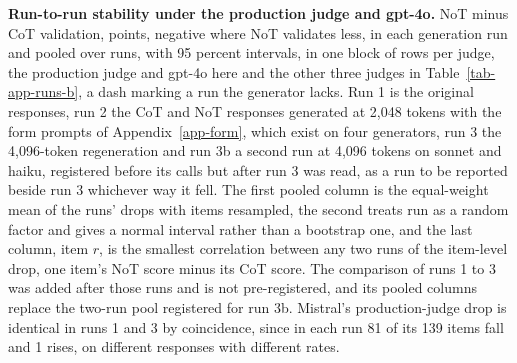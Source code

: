 \begin{table}
\centering
\small
\caption{\textbf{Run-to-run stability under the production judge and gpt-4o.}
NoT minus CoT validation, points, negative where NoT validates less,
in each generation run and pooled over runs, with 95 percent intervals, in
one block of rows per judge, the production judge and gpt-4o here and the
other three judges in Table~\ref{tab-app-runs-b}, a dash marking a run
the generator lacks.
Run 1 is the original
responses, run 2 the CoT and NoT responses generated at 2,048 tokens with the
form prompts of Appendix~\ref{app-form}, which exist on four generators, run
3 the 4,096-token regeneration and run 3b a second
run at 4,096 tokens on sonnet and haiku, registered before its
calls but after run 3 was read, as a run to be reported beside run 3
whichever way it fell. The first pooled column is the equal-weight mean of
the runs' drops with items resampled, the second treats run as a random
factor and gives a normal interval rather than a bootstrap one, and the last
column, item $r$, is the smallest correlation between any two runs of the
item-level drop, one item's NoT score minus its CoT score. The comparison of runs 1 to 3 was added after those runs and is not
pre-registered, and its pooled columns replace the two-run pool registered
for run 3b. Mistral's production-judge drop is identical in runs 1 and 3 by
coincidence, since in each run 81 of its 139 items fall and 1 rises, on
different responses with different rates.}

\end{table}
